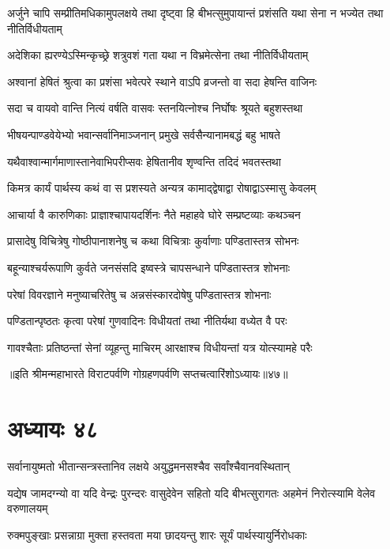 \threelineshloka
{अर्जुने चापि सम्प्रीतिमधिकामुपलक्षये}
{तथा दृष्ट्वा हि बीभत्सुमुपायान्तं प्रशंसति}
{यथा सेना न भज्येत तथा नीतिर्विधीयताम्}


\twolineshloka
{अदेशिका ह्यरण्येऽस्मिन्कृच्छ्रे शत्रुवशं गता}
{यथा न विभ्रमेत्सेना तथा नीतिर्विधीयताम्}


\twolineshloka
{अश्वानां हेषितं श्रुत्वा का प्रशंसा भवेत्परे}
{स्थाने वाऽपि व्रजन्तो वा सदा हेषन्ति वाजिनः}


\twolineshloka
{सदा च वायवो वान्ति नित्यं वर्षति वासवः}
{स्तनयित्नोश्च निर्घोषः श्रूयते बहुशस्तथा}


\twolineshloka
{भीषयन्पाण्डवेयेभ्यो भवान्सर्वानिमाञ्जनान्}
{प्रमुखे सर्वसैन्यानामबद्धं बहु भाषते}


\twolineshloka
{यथैवाश्वान्मार्गमाणास्तानेवाभिपरीप्सवः}
{हेषितानीव शृण्वन्ति तदिदं भवतस्तथा}


\twolineshloka
{किमत्र कार्यं पार्थस्य कथं वा स प्रशस्यते}
{अन्यत्र कामाद्द्वेषाद्वा रोषाद्वाऽस्मासु केवलम्}


\twolineshloka
{आचार्या वै कारुणिकाः प्राज्ञाश्चापायदर्शिनः}
{नैते महाहवे घोरे सम्प्रष्टव्याः कथञ्चन}


\twolineshloka
{प्रासादेषु विचित्रेषु गोष्ठीपानाशनेषु च}
{कथा विचित्राः कुर्वाणाः पण्डितास्तत्र सोभनः}


\twolineshloka
{बहून्याश्चर्यरूपाणि कुर्वते जनसंसदि}
{इष्वस्त्रे चापसन्धाने पण्डितास्तत्र शोभनाः}


\twolineshloka
{परेषां विवरज्ञाने मनुष्याचरितेषु च}
{अन्नसंस्कारदोषेषु पण्डितास्तत्र शोभनाः}


\twolineshloka
{पण्डितान्पृष्ठतः कृत्वा परेषां गुणवादिनः}
{विधीयतां तथा नीतिर्यथा वध्येत वै परः}


\twolineshloka
{गावश्चैताः प्रतिष्ठन्तां सेनां व्यूहन्तु माचिरम्}
{आरक्षाश्च विधीयन्तां यत्र योत्स्यामहे परैः}

॥इति श्रीमन्महाभारते विराटपर्वणि गोग्रहणपर्वणि सप्तचत्वारिंशोऽध्यायः॥४७॥

\chapter{अध्यायः ४८}

\twolineshloka
{सर्वानायुष्मतो भीतान्सन्त्रस्तानिव लक्षये}
{अयुद्धमनसश्चैव सर्वांश्चैवानवस्थितान्}


\threelineshloka
{यद्येष जामदग्न्यो वा यदि वेन्द्रः पुरन्दरः}
{वासुदेवेन सहितो यदि बीभत्सुरागतः}
{अहमेनं निरोत्स्यामि वेलेव वरुणालयम्}


\twolineshloka
{रुक्मपुङ्खाः प्रसन्नाग्रा मुक्ता हस्तवता मया}
{छादयन्तु शारः सूर्यं पार्थस्यायुर्निरोधकाः}


